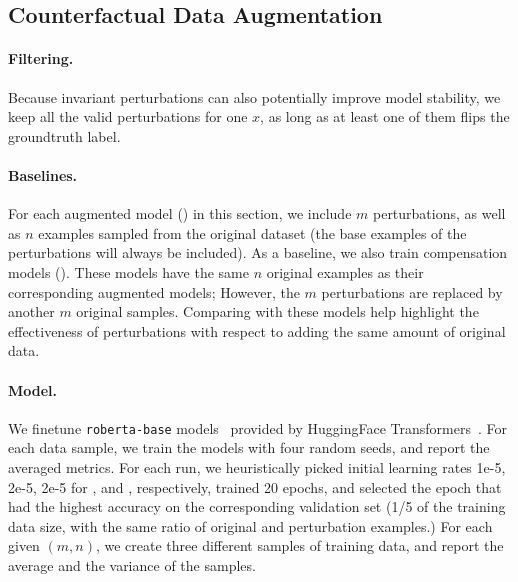 \TableAugSST
\TableAugNLI

\subsection{Counterfactual Data Augmentation}
\label{subsec:augmentation}
\paragraph{Filtering.}
Because invariant perturbations can also potentially improve model stability, we keep all the valid perturbations for one $x$, as long as at least one of them flips the groundtruth label.

\paragraph{Baselines.}
For each augmented model (\maug) in this section, we include $m$ perturbations, as well as $n$ examples sampled from the original dataset (the base examples of the perturbations will always be included).
As a baseline, we also train compensation models (\mcomp).
These models have the same $n$ original examples as their corresponding augmented models; However, the $m$ perturbations are replaced by another $m$ original samples.
Comparing with these models help highlight the effectiveness of perturbations with respect to adding the same amount of original data. 

\paragraph{Model.}
We finetune \texttt{roberta-base} models~\cite{liu2019roberta} provided by HuggingFace Transformers~\cite{Wolf2019HuggingFacesTS}.
For each data sample, we train the models with four random seeds, and report the averaged metrics. 
For each run, we heuristically picked initial learning rates 1e-5, 2e-5, 2e-5 for \sst, \nli and \qqp, respectively, trained 20 epochs, and selected the epoch that had the highest accuracy on the corresponding validation set (1/5 of the training data size, with the same ratio of original and perturbation examples.)
For each given $(m,n)$, we create three different samples of training data, and report the average and the variance of the samples. 




